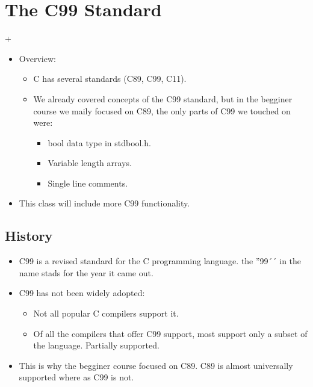 \section{The C99 Standard}+
\begin{itemize}
    \item Overview:
        \begin{itemize}
            \item C has several standards (C89, C99, C11).
            \item We already covered concepts of the C99 standard, but in the begginer course we maily focused on C89, the only parts of C99 we touched on were:
                \begin{itemize}
                    \item bool data type in stdbool.h.
                    \item Variable length arrays.
                    \item Single line comments.
                \end{itemize}
        \end{itemize}
    
    \item This class will include more C99 functionality.
\end{itemize}

\subsection{History}
\begin{itemize}
    \item C99 is a revised standard for the C programming language. the ''99´´ in the name stads for the year it came out.
    \item C99 has not been widely adopted:
        \begin{itemize}
            \item Not all popular C compilers support it.
            \item Of all the compilers that offer C99 support, most support only a subset of the language. Partially supported.
        \end{itemize}
    \item This is why the begginer course focused on C89. C89 is almost universally supported where as C99 is not.
\end{itemize}

